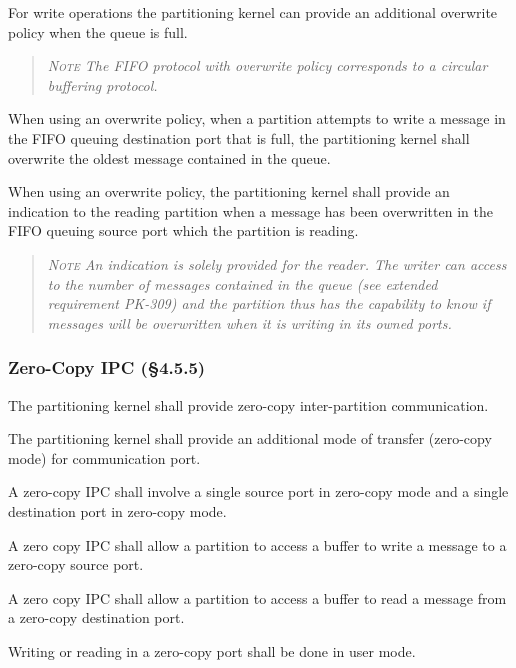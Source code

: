 For write operations the partitioning kernel can provide an additional overwrite policy when the queue is full.
\begin{quote}\it
\textsc{Note}
The FIFO protocol with overwrite policy corresponds to a circular buffering protocol.
\end{quote}

When using an overwrite policy, when a partition attempts to write a message in the FIFO queuing destination port that is full, the partitioning kernel shall overwrite the oldest message contained in the queue.

When using an overwrite policy, the partitioning kernel shall provide an indication to the reading partition when a message has been overwritten in the FIFO queuing source port which the partition is reading.
\begin{quote}\it
\textsc{Note}
An indication is solely provided for the reader. The writer can access to the number of messages contained in the queue (see extended requirement PK-309) and the partition thus has the capability to know if messages will be overwritten when it is writing in its owned ports.
\end{quote}

\subsubsection{Zero-Copy IPC (\S4.5.5)}

The partitioning kernel shall provide zero-copy inter-partition communication.

The partitioning kernel shall provide an additional mode of transfer (zero-copy mode) for communication port.

A zero-copy IPC shall involve a single source port in zero-copy mode and a single destination port in zero-copy mode.

A zero copy IPC shall allow a partition to access a buffer to write a message to a zero-copy source port.

A zero copy IPC shall allow a partition to access a buffer to read a message from a zero-copy destination port.

Writing or reading in a zero-copy port shall be done in user mode.

